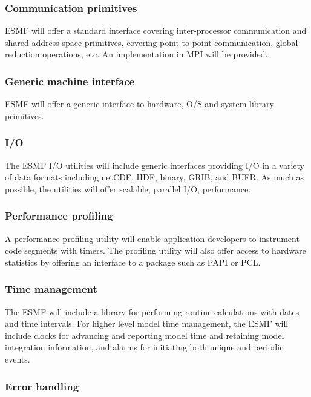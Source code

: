 \subsubsection{Communication primitives}

ESMF will offer a standard interface covering inter-processor
communication and shared address space primitives, covering
point-to-point communication, global reduction operations, etc. An
implementation in MPI will be provided.

\subsubsection{Generic machine interface}

ESMF will offer a generic interface to hardware, O/S and system
library primitives.

\subsubsection{I/O}

The ESMF I/O utilities will include generic interfaces providing I/O
in a variety of data formats including netCDF, HDF, binary, GRIB, and
BUFR. As much as possible, the utilities will offer scalable, parallel I/O,
performance.

\subsubsection{Performance profiling}

A performance profiling utility will enable application developers to 
instrument code segments with timers. The profiling utility will also
offer access to hardware statistics by offering an interface to a
package such as PAPI or PCL.

\subsubsection{Time management}

The ESMF will include a library for performing routine 
calculations with dates and time intervals.  For higher level model
time management, the ESMF will include clocks for advancing and 
reporting model time and retaining model integration information, 
and alarms for initiating both unique and periodic events.

\subsubsection{Error handling}


